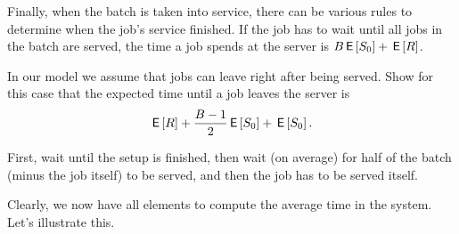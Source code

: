 Finally, when the batch is taken into service, there can be various rules to determine when the job's service finished. If the job has to wait until all jobs in the batch are served, the time a job spends at the server is $B \,\mathsf{E}\left[S_0\right] + \,\mathsf{E}\left[R\right]$. 

\begin{exercise}[\faFlask]
In our model we assume that jobs can leave right after being served.  Show for this case that the expected time  until a job leaves the server is
\begin{equation*}
\,\mathsf{E}\left[R\right]  + \frac{B-1}{2}\,\mathsf{E}\left[S_0\right] +\,\mathsf{E}\left[S_0\right].
\end{equation*}
\begin{solution}
  First, wait until the setup is finished,  then wait (on average) for half of the batch (minus the job itself) to be served, and then the job has to be served itself.
\end{solution}
\end{exercise}

Clearly, we now have all elements to compute the average time in the system. Let's illustrate this. 

